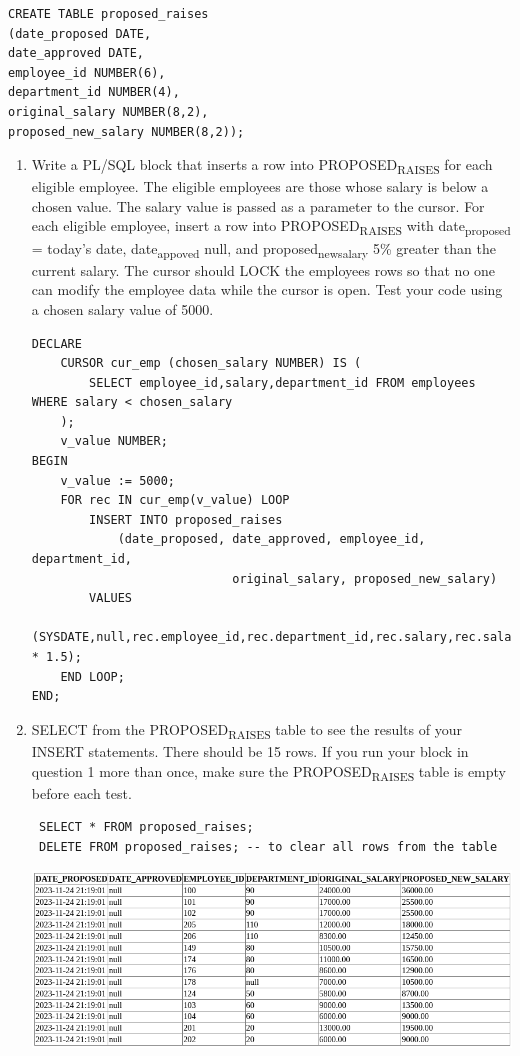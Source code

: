 \documentclass[11pt]{article}
\begin{document}
\begin{verbatim}
CREATE TABLE proposed_raises
(date_proposed DATE,
date_approved DATE,
employee_id NUMBER(6),
department_id NUMBER(4),
original_salary NUMBER(8,2),
proposed_new_salary NUMBER(8,2));
\end{verbatim}
\begin{enumerate}
\item Write a PL/SQL block that inserts a row into PROPOSED\textsubscript{RAISES} for each eligible employee. The eligible employees are those whose salary is below a chosen value. The salary value is passed as a parameter to the cursor. For each eligible employee, insert a row into PROPOSED\textsubscript{RAISES} with date\textsubscript{proposed} = today’s date, date\textsubscript{appoved} null, and proposed\textsubscript{new}\textsubscript{salary} 5\% greater than the current salary. The cursor should LOCK the employees rows so that no one can modify the employee data while the cursor is open. Test your code using a chosen salary value of 5000.
\begin{verbatim}
DECLARE
    CURSOR cur_emp (chosen_salary NUMBER) IS (
        SELECT employee_id,salary,department_id FROM employees WHERE salary < chosen_salary
    );
    v_value NUMBER;
BEGIN
    v_value := 5000;
    FOR rec IN cur_emp(v_value) LOOP
        INSERT INTO proposed_raises
            (date_proposed, date_approved, employee_id, department_id,
                            original_salary, proposed_new_salary)
        VALUES
            (SYSDATE,null,rec.employee_id,rec.department_id,rec.salary,rec.salary * 1.5);
    END LOOP;
END;
\end{verbatim}
\item SELECT from the PROPOSED\textsubscript{RAISES} table to see the results of your INSERT statements. There should be 15 rows. If you run your block in question 1 more than once, make sure the PROPOSED\textsubscript{RAISES} table is empty before each test.
\begin{verbatim}
 SELECT * FROM proposed_raises;
 DELETE FROM proposed_raises; -- to clear all rows from the table
\end{verbatim}

\begin{center}
\includegraphics[width=.9\linewidth]{./resources/prop_sal_tab1.png}
\end{center}


\end{enumerate}
\end{document}
